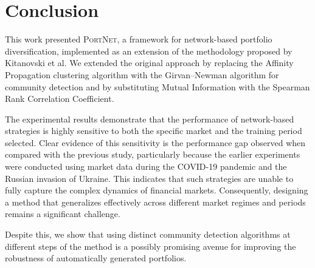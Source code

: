 \documentclass[acmsmall,screen,nonacm]{acmart}
\begin{document}
\section{Conclusion} \label{conclusion}

This work presented \textsc{PortNet}, a framework for network-based portfolio diversification, implemented as an extension of the methodology proposed by Kitanovski et al.
We extended the original approach by replacing the Affinity Propagation clustering algorithm with the Girvan–Newman algorithm for community detection and by substituting Mutual Information with the Spearman Rank Correlation Coefficient.

The experimental results demonstrate that the performance of network-based strategies is highly sensitive to both the specific market and the training period selected.
Clear evidence of this sensitivity is the performance gap observed when compared with the previous study, particularly because the earlier experiments were conducted using market data during the COVID-19 pandemic and the Russian invasion of Ukraine.
This indicates that such strategies are unable to fully capture the complex dynamics of financial markets.
Consequently, designing a method that generalizes effectively across different market regimes and periods remains a significant challenge.

Despite this, we show that using distinct community detection algorithms at different steps of the method is a possibly promising avenue for improving the robustness of automatically generated portfolios.




\newpage
\end{document}
